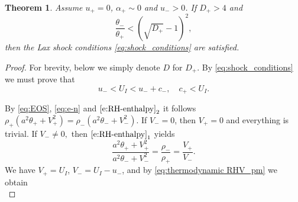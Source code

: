 \documentclass[10pt,a4paper]{article}
\newtheorem{theorem}{Theorem}[section]
\numberwithin{equation}{section}
\begin{document}
\begin{theorem}\label{thm:shock condition}
Assume $u_+=0$, $\alpha_+\sim0$ and $u_->0$. If $D_{+} > 4$ and
\begin{equation}\label{eq:shock condition+}
     \frac{\theta_-}{\theta_+} < (\sqrt{D_{+}} - 1)^2,
\end{equation} 
then the Lax shock conditions \eqref{eq:shock_conditions} are satisfied.
\end{theorem}
\begin{proof}
For brevity, below we simply denote $D$ for $D_{+}$. By \eqref{eq:shock_conditions} we must prove that 
\begin{equation}\label{eq:shock_conditions2}
     u_-< U_I < u_- + c_-, \quad  c_{+} < U_I.
\end{equation} 
\par
By \eqref{eq:EOS}, \eqref{eq:e-n} and $\eqref{e:RH-enthalpy}_2$ it follows $\rho_+\left(a^2\theta_+ + V_+^2\right) = \rho_-\left(a^2\theta_- + V_-^2\right)$. If $V_-=0$, then $V_+=0$ and everything is trivial. If $V_-\neq 0,$ then $\eqref{e:RH-enthalpy}_1$ yields
\begin{equation}\label{eq:thermodynamic RHV_pm}
   \frac{a^2\theta_+ + V_+^2}{a^2\theta_- + V_-^2} = \frac{\rho_-}{\rho_+} = \frac{V_+}{V_-}.
\end{equation}
We have $V_{+}= U_I$, $V_-= U_I - u_-$,
and by \eqref{eq:thermodynamic RHV_pm} we obtain
\begin{equation}\label{e:xyu}

\end{equation}
\end{proof}
\end{document}
